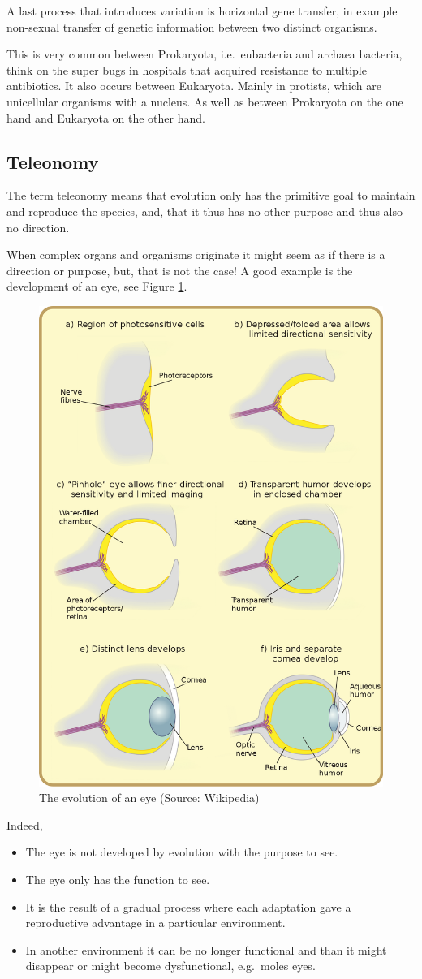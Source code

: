 \documentclass[
  11pt,
]{book}
\begin{document}
A last process that introduces variation is horizontal gene transfer, in example non-sexual transfer of genetic information between two distinct organisms.

This is very common between Prokaryota, i.e.~eubacteria and archaea bacteria, think on the super bugs in hospitals that acquired resistance to multiple antibiotics. It also occurs between Eukaryota. Mainly in protists, which are unicellular organisms with a nucleus. As well as between Prokaryota on the one hand and Eukaryota on the other hand.

\hypertarget{teleonomy}{%
\subsection{Teleonomy}\label{teleonomy}}

The term teleonomy means that evolution only has the primitive goal to maintain and reproduce the species, and, that it thus has no other purpose and thus also no direction.

When complex organs and organisms originate it might seem as if there is a direction or purpose, but, that is not the case! A good example is the development of an eye, see Figure \ref{fig:evolutionEye}.

\begin{figure}

{\centering \includegraphics[width=0.45\linewidth]{./figs/evolutionEye} 

}

\caption{The evolution of an eye (Source: Wikipedia)}\label{fig:evolutionEye}
\end{figure}

Indeed,

\begin{itemize}
\item
  The eye is not developed by evolution with the purpose to see.
\item
  The eye only has the function to see.
\item
  It is the result of a gradual process where each adaptation gave a reproductive advantage in a particular environment.
\item
  In another environment it can be no longer functional and than it might disappear or might become dysfunctional, e.g.~moles eyes.
\end{itemize}
\end{document}
